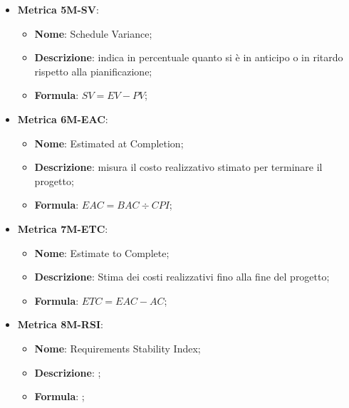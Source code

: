 \begin{itemize}
    \item \textbf{Metrica 5M-SV}:
    \begin{itemize}
        \item \textbf{Nome}: Schedule Variance;
        \item \textbf{Descrizione}: indica in percentuale quanto si è in anticipo o in ritardo rispetto alla pianificazione;
        \item \textbf{Formula}: $SV = EV - PV$;
    \end{itemize}
\end{itemize}

\begin{itemize}
    \item \textbf{Metrica 6M-EAC}:
    \begin{itemize}
        \item \textbf{Nome}: Estimated at Completion;
        \item \textbf{Descrizione}: misura il costo realizzativo stimato per terminare il progetto;
        \item \textbf{Formula}: $EAC = BAC \div CPI$;
    \end{itemize}
\end{itemize}

\begin{itemize}
    \item \textbf{Metrica 7M-ETC}:
    \begin{itemize}
        \item \textbf{Nome}: Estimate to Complete;
        \item \textbf{Descrizione}: Stima dei costi realizzativi fino alla fine del progetto;
        \item \textbf{Formula}: $ETC = EAC - AC$;
    \end{itemize}
\end{itemize}

\begin{itemize}
    \item \textbf{Metrica 8M-RSI}:
    \begin{itemize}
        \item \textbf{Nome}: Requirements Stability Index;
        \item \textbf{Descrizione}: ;
        \item \textbf{Formula}: ;
    \end{itemize}
\end{itemize}

